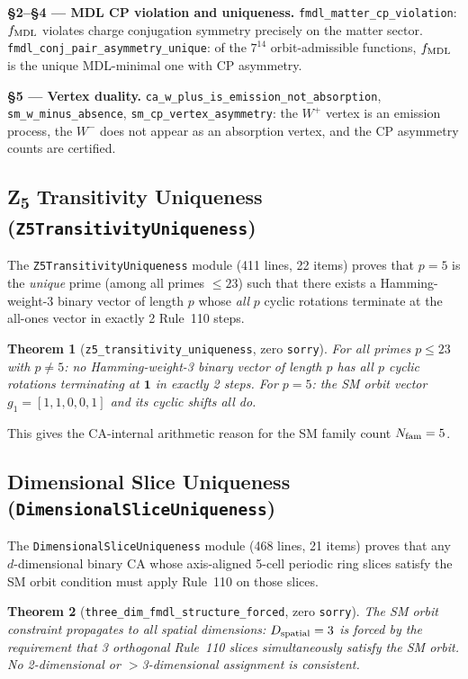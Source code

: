 \documentclass[11pt,a4paper]{article}
\newtheorem{theorem}{Theorem}[section]
\theoremstyle{definition}
\begin{document}
\textbf{§2--§4 — MDL CP violation and uniqueness.}
\lstinline|fmdl_matter_cp_violation|: $f_{\rm MDL}$ violates charge conjugation symmetry
precisely on the matter sector.  \lstinline|fmdl_conj_pair_asymmetry_unique|: of the $7^{14}$
orbit-admissible functions, $f_{\rm MDL}$ is the unique MDL-minimal one with CP asymmetry.

\textbf{§5 — Vertex duality.}
\lstinline|ca_w_plus_is_emission_not_absorption|, \lstinline|sm_w_minus_absence|,
\lstinline|sm_cp_vertex_asymmetry|: the $W^+$ vertex is an emission process, the
$W^-$ does not appear as an absorption vertex, and the CP asymmetry counts are certified.

\subsection{Z\textsubscript{5} Transitivity Uniqueness (\texttt{Z5TransitivityUniqueness})}\label{subsec:z5-transitivity}

The \texttt{Z5TransitivityUniqueness} module (411 lines, 22 items) proves that
$p=5$ is the \emph{unique} prime (among all primes $\leq 23$) such that there exists a
Hamming-weight-3 binary vector of length $p$ whose \emph{all} $p$ cyclic rotations
terminate at the all-ones vector in exactly 2 Rule~110 steps.

\begin{theorem}[\lstinline|z5_transitivity_uniqueness|, zero \texttt{sorry}]
For all primes $p \leq 23$ with $p \neq 5$: no Hamming-weight-3 binary vector of
length $p$ has all $p$ cyclic rotations terminating at $\mathbf{1}$ in exactly 2 steps.
For $p = 5$: the SM orbit vector $g_1 = [1,1,0,0,1]$ and its cyclic shifts all do.
\end{theorem}

This gives the CA-internal arithmetic reason for the SM family count $N_{\rm fam} = 5$.

\subsection[Dimensional Slice Uniqueness]{Dimensional Slice Uniqueness (\texttt{DimensionalSliceUniqueness})}\label{subsec:dimensional-slice}

The \texttt{DimensionalSliceUniqueness} module (468 lines, 21 items) proves that any
$d$-dimensional binary CA whose axis-aligned 5-cell periodic ring slices satisfy the SM
orbit condition must apply Rule~110 on those slices.

\begin{theorem}[\lstinline|three_dim_fmdl_structure_forced|, zero \texttt{sorry}]
The SM orbit constraint propagates to all spatial dimensions: $D_{\rm spatial} = 3$ is
forced by the requirement that 3 orthogonal Rule~110 slices simultaneously satisfy the
SM orbit.  No 2-dimensional or $>$3-dimensional assignment is consistent.
\end{theorem}
\end{document}

